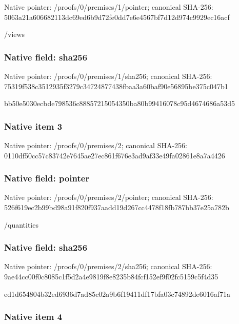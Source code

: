\documentclass[10pt,a4paper]{article}
\begin{document}
Native pointer: /proofs/0/premises/1/pointer; canonical SHA-256: 5063a21a606682113dc69ed6\allowbreak{}b9d72fe0dd7e6e4567bf7d12\allowbreak{}d974c9929ec16acf


/views


\subsubsection{Native field: sha256}


Native pointer: /proofs/0/premises/1/sha256; canonical SHA-256: 75319f538c3512935f3279c3\allowbreak{}4724877438fbaa3a60baf90e\allowbreak{}56895be375c047b1


bb50e5030ecbde798536c888\allowbreak{}57215054350ba80b99416078\allowbreak{}c95d4674686a53d5


\subsubsection{Native item 3}


Native pointer: /proofs/0/premises/2; canonical SHA-256: 0110df50cc57c83742e7645a\allowbreak{}e27ec861f676e3ad9af33e49\allowbreak{}fa02861e8a7a4426



\subsubsection{Native field: pointer}


Native pointer: /proofs/0/premises/2/pointer; canonical SHA-256: 526f619ec2b99bd98a91f820\allowbreak{}f937aadd19d267cc4478f18f\allowbreak{}b787bb37e25a782b


/quantities


\subsubsection{Native field: sha256}


Native pointer: /proofs/0/premises/2/sha256; canonical SHA-256: 9ae44cc00f0c8085c1f5d2a4\allowbreak{}e9819f8e8235b84fcf152ef9\allowbreak{}f02fc5159c5f4d35


ed1d654804b32ed6936d7ad8\allowbreak{}5c02a9b6f19411df17bfa03c\allowbreak{}74892de6016af71a


\subsubsection{Native item 4}
\end{document}
